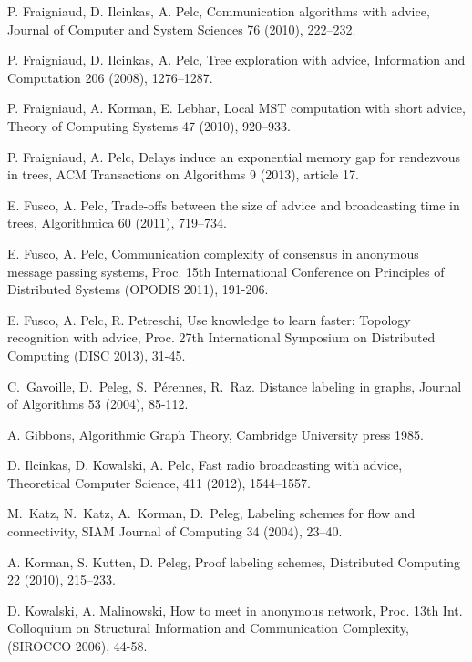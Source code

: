 \documentclass{llncs}
\begin{document}
\begin{thebibliography}{12}
P. Fraigniaud, D. Ilcinkas, A. Pelc, 
Communication algorithms with advice, Journal of  Computer and System Sciences 76 (2010), 222--232.


P. Fraigniaud, D. Ilcinkas, A. Pelc, 
Tree exploration with advice, Information and Computation 206 (2008), 1276--1287.


P. Fraigniaud, A. Korman, E. Lebhar,
Local MST computation with short advice,
Theory of Computing Systems 47 (2010), 920--933.

P. Fraigniaud, A. Pelc, Delays induce an exponential memory gap for rendezvous in trees, ACM Transactions on Algorithms 9 (2013), article 17. 




E. Fusco, A. Pelc, Trade-offs between the size of advice and broadcasting time in trees, Algorithmica 60 (2011), 719--734. 

E. Fusco, A. Pelc, Communication complexity of consensus in anonymous message passing systems, Proc. 15th International Conference on Principles of Distributed Systems (OPODIS 2011), 191-206. 

E. Fusco, A. Pelc, R. Petreschi, Use knowledge to learn faster: Topology recognition with advice, Proc. 27th International Symposium on Distributed Computing (DISC 2013), 31-45.

C.~Gavoille, D.~Peleg, S.~P\'{e}rennes, R.~Raz.
Distance labeling in graphs, 
Journal of Algorithms 53 (2004), 85-112.

A. Gibbons, Algorithmic Graph Theory, Cambridge University press 1985.






D. Ilcinkas, D. Kowalski, A. Pelc, 
Fast radio broadcasting with advice, 
 Theoretical Computer Science, 411 (2012),  1544--1557.

M.~Katz, N.~Katz, A.~Korman, D.~Peleg, Labeling schemes for flow and
connectivity, 
SIAM Journal of  Computing 34 (2004), 23--40.



A. Korman, S. Kutten, D. Peleg, Proof labeling schemes,
Distributed Computing 22 (2010), 215--233.  




D. Kowalski, A. Malinowski,
How to meet in anonymous network,
Proc. 13th Int. Colloquium on Structural Information and Communication Complexity,
(SIROCCO 2006), 44-58. 


\end{thebibliography}
\end{document}
